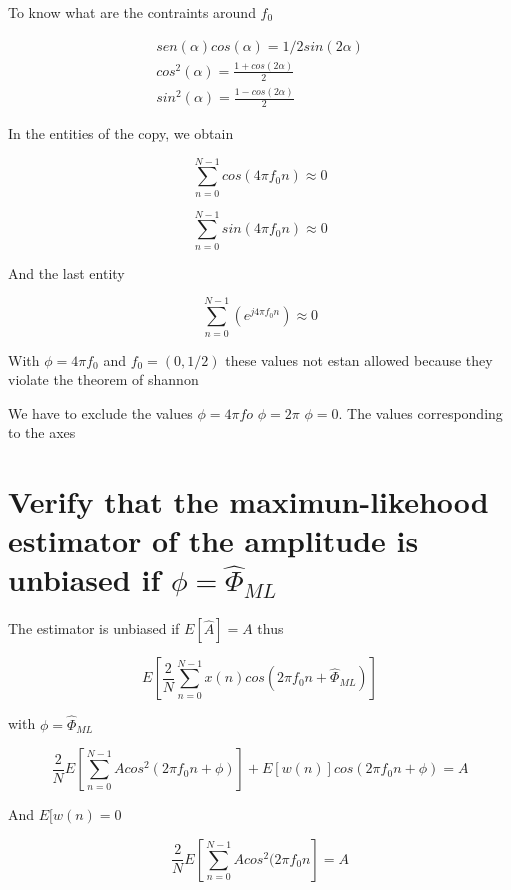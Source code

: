 \documentclass{report}
\begin{document}
To know what are the contraints around $f_0$

\begin{gather*}
sen(\alpha)cos(\alpha) = 1/2 sin(2\alpha)\\
cos^2(\alpha) = \frac{1+cos(2\alpha)}{2}\\
sin^2(\alpha) = \frac{1-cos(2\alpha)}{2}
\end{gather*}

In the entities of the copy, we obtain 

\begin{equation}\label{key}
\sum_{n=0}^{N-1}cos(4\pi f_0 n) \approx 0
\end{equation}

\begin{equation}\label{key}
\sum_{n=0}^{N-1}sin(4\pi f_0 n) \approx 0
\end{equation}

And the last entity 

\begin{equation}\label{key}
\sum_{n=0}^{N-1}(e^{j4\pi f_0n}) \approx 0
\end{equation}


With $\phi = 4\pi f_0$ and $f_0 =(0,1/2) $ these values not estan allowed because they violate the theorem of shannon



We have to exclude the values
$ \phi = 4\pi fo  $
$ \phi = 2\pi $
$ \phi = 0 $. The values corresponding to the axes


\section{Verify that the maximun-likehood estimator of the amplitude is 
	unbiased if $ \phi =  \hat{\Phi}_{ML} $}

The estimator is unbiased if $ E[\hat{A}] = A $ thus

\begin{equation}
E[\frac{2}{N}\sum_{n=0}^{N-1}x(n)cos(2\pi f_0 n + \hat{\Phi}_{ML})]
\end{equation}

with $ \phi =  \hat{\Phi}_{ML} $

\begin{equation}
\frac{2}{N}E[\sum_{n=0}^{N-1}Acos^2(2\pi f_0 n + \phi)]+E[w(n)]cos(2\pi f_0 n + 
\phi) = A
\end{equation}

And $ E[w(n)=0 $


\begin{equation}
\frac{2}{N}E[\sum_{n=0}^{N-1}Acos^2(2\pi f_0 n] = A
\end{equation}
\end{document}
